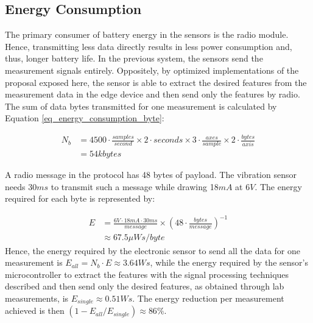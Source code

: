 \documentclass[conference]{IEEEtran}
\begin{document}


\subsection{Energy Consumption}

The primary consumer of battery energy in the sensors is the radio module. Hence, transmitting less data directly results in less power consumption and, thus, longer battery life. In the previous system, the sensors send the measurement signals entirely. Oppositely, by optimized implementations of the proposal exposed here, the sensor is able to extract the desired features from the measurement data in the edge device and then send only the features by radio. The sum of data bytes transmitted for one measurement is calculated by Equation \ref{eq_energy_consumption_byte}:

\begin{equation}
\begin{aligned}
	N_{b} &= 4500 \cdot  \frac{samples}{second} \times 2 \cdot seconds \times 3 \cdot \frac{axes}{sample} \times 2 \cdot \frac{bytes}{axis} \\
	  &= 54 kbytes
\end{aligned}
\label{eq_energy_consumption_byte}
\end{equation}

A radio message in the protocol has 48 bytes of payload. The vibration sensor needs 30$ms$ to transmit such a message while drawing 18$mA$ at 6$V$. The energy required for each byte is represented by: 

\begin{equation}
\begin{aligned}
	E &= \frac{6V \cdot 18mA \cdot 30ms}{message} \times \left( 48 \cdot \frac{bytes}{message} \right)^{-1} \\
	  & \approx 67.5 \mu Ws/byte
\end{aligned}
\label{eq_energy_consumption_pro_byte}
\end{equation}
Hence, the energy required by the electronic sensor to send all the data for one measurement is $E_{all} = N_{b} \cdot E \approx 3.64 Ws$, while the energy required by the sensor's microcontroller to extract the features with the signal processing techniques described and then send only the desired features, as obtained through lab measurements, is $E_{single} \approx 0.51 Ws$. The energy reduction per measurement achieved is then $(1 - E_{all}/E_{single}) \approx 86\% $.
\end{document}
